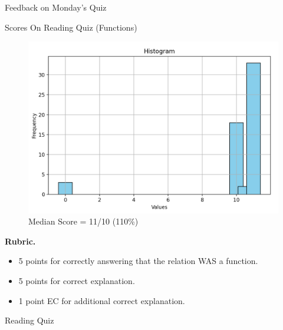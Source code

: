 \documentclass[10pt]{beamer}
\begin{document}
\begin{frame}[standout]
Feedback on Monday's Quiz 
\end{frame}



\begin{frame}{Scores On Reading Quiz (Functions)}
\footnotesize 
\begin{figure}[ht]
        \centering
        \includegraphics[width=.7\textwidth]{images/reading_quiz_scores}
   		 \caption{Median Score = 11/10 (110\%)}
\end{figure}
\vfill 
\textbf{Rubric.}  	
\begin{itemize}
\item  5 points for correctly answering that the relation WAS a function.
\item 5 points for correct explanation.
\item 1 point EC for additional correct explanation.
\end{itemize}
\end{frame}


\begin{frame}[standout]
Reading Quiz
\end{frame}
\end{document}
